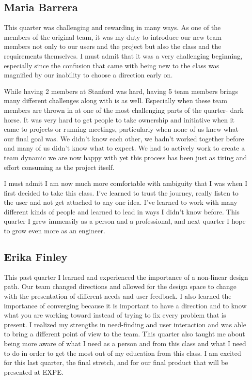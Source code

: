 \subsection{Maria Barrera}

This quarter was challenging and rewarding in many ways. As one of the members of the original team, it was my duty to introduce our new team members not only to our users and the project but also the class and the requirements themselves. I must admit that it was a very challenging beginning, especially since the confusion that came with being new to the class was magnified by our inability to choose a direction early on. 

While having 2 members at Stanford was hard, having 5 team members brings many different challenges along with is as well. Especially when these team members are thrown in at one of the most challenging parts of the quarter- dark horse. It was very hard to get people to take ownership and initiative when it came to projects or running meetings, particularly when none of us knew what our final goal was. We didn't know each other, we hadn't worked together before and many of us didn't know what to expect. We had to actively work to create a team dynamic we are now happy with yet this process has been just as tiring and effort consuming as the project itself. 

 I must admit I am now much more comfortable with ambiguity that I was when I first decided to take this class. I've learned to trust the journey, really listen to the user and not get attached to any one idea. I've learned to work with many different kinds of people and learned to lead in ways I didn't know before. This quarter I grew immensily as a person and a professional, and next quarter I hope to grow even more as an engineer. 

\subsection{Erika Finley}
This past quarter I learned and experienced the importance of a non-linear design path.  Our team changed directions and allowed for the design space to change with the presentation of different needs and user feedback.  I also learned the importance of converging because it is important to have a direction and to know what you are working toward instead of trying to fix every problem that is present. I realized my strengths in need-finding and user interaction and was able to bring a different point of view to the team.  This quarter also taught me about being more aware of what I need as a person and from this class and what I need to do in order to get the most out of my education from this class.  I am excited for this last quarter, the final stretch, and for our final product that will be presented at EXPE. 

